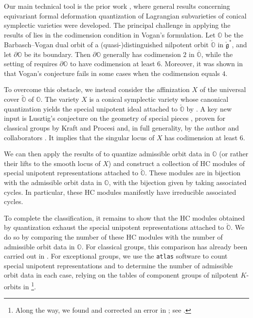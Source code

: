 \documentclass[11pt, a4paper]{amsart}
\newcommand{\orb}{\mathbb{O}}
\newcommand{\fg}{\mathfrak{g}}
\newcommand{\ckfg}{{\check{\fg}}}
\newcommand{\ckorb}{\check{\orb}}
\newcommand{\R}{\mathbb{R}}
\newcommand{\GR}{G_\R}
\theoremstyle{definition}
\numberwithin{equation}{section}
\begin{document}
Our main technical tool is the prior work \cite{LY}, where general results concerning equivariant formal deformation quantization of Lagrangian subvarieties of conical symplectic varieties were developed.
The principal challenge in applying the results of \cite{LY} lies in the codimension condition in Vogan's formulation. Let $\orb$ be the Barbasch--Vogan dual orbit of a (quasi-)distinguished nilpotent orbit $\ckorb$ in $\ckfg^*$, and let $\partial \orb$ be its boundary. Then $\partial \orb$ generally has codimension $2$ in $\overline{\orb}$, while the setting of \cite{LY} requires $\partial \orb$ to have codimension at least $6$. Moreover, it was shown in \cite{LosevYu} that Vogan’s conjecture fails in some cases when the codimension equals $4$.

To overcome this obstacle, we instead consider the affinization $X$ of the universal cover $\widetilde{\orb}$ of $\orb$. The variety $X$ is a conical symplectic variety whose canonical quantization yields the special unipotent ideal attached to $\ckorb$ by \cite{LMBM}. A key new input is Lusztig’s conjecture on the geometry of special pieces \cite{Lusztig:unipotent}, proven for classical groups by Kraft and Procesi \cite{Kraft-Procesi:special} and, in full generality, by the author and collaborators \cite{JLSY:SpecialPiece}. It implies that the singular locus of $X$ has codimension at least $6$.

We can then apply the results of \cite{LY} to quantize admissible orbit data in $\orb$ (or rather their lifts to the smooth locus of $X$) and construct a collection of HC modules of special unipotent representations attached to $\ckorb$.
These modules are in bijection with the admissible orbit data in $\orb$, with the bijection given by taking associated cycles. In particular, these HC modules manifestly have irreducible associated cycles.

To complete the classification, it remains to show that the HC modules obtained by quantization exhaust the special unipotent representations attached to $\ckorb$. We do so by comparing the number of these HC modules with the number of admissible orbit data in $\orb$. For classical groups, this comparison has already been carried out in \cite{BMSZ:counting}. For exceptional groups, we use the \texttt{atlas} software to count special unipotent representations and to determine the number of admissible orbit data in each case, relying on the tables of component groups of nilpotent $K$-orbits in \cite{King}\footnote{Along the way, we found and corrected an error in \cite{King}; see .}. 
\end{document}
